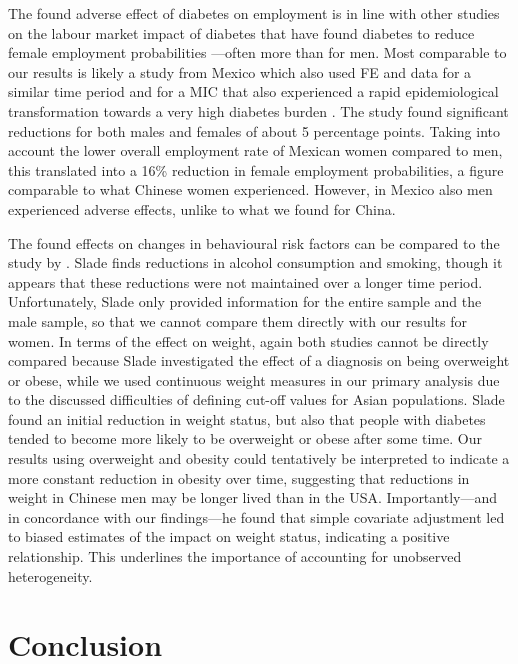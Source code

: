The found adverse effect of diabetes on employment is in line with other studies on the labour market impact of diabetes that have found diabetes to reduce female employment probabilities \parencite{Minor2010,Latif2009,Harris2009,Seuring2016}---often more than for men. Most comparable to our results is likely a study from Mexico which also used \ac{FE} and data for a similar time period and for a \ac{MIC} that also experienced a rapid epidemiological transformation towards a very high diabetes burden  \parencite{Seuring2016}. The study found significant reductions for both males and females of about 5 percentage points. Taking into account the lower overall employment rate of Mexican women compared to men, this translated into a 16\% reduction in female employment probabilities, a figure comparable to what Chinese women experienced. However, in Mexico also men experienced adverse effects, unlike to what we found for China.

The found effects on changes in behavioural risk factors can be compared to the study by \parencite{Slade2012}. Slade finds reductions in alcohol consumption and smoking, though it appears that these reductions were not maintained over a longer time period. Unfortunately, Slade only provided information for the entire sample and the male sample, so that we cannot compare them directly with our results for women. In terms of the effect on weight, again both studies cannot be directly compared because Slade investigated the effect of a diagnosis on being overweight or obese, while we used continuous weight measures in our primary analysis due to the discussed difficulties of defining cut-off values for Asian populations. Slade found an initial reduction in weight status, but also that people with diabetes tended to become more likely to be overweight or obese after some time. Our results using overweight and obesity could tentatively be interpreted to indicate a more constant reduction in obesity over time, suggesting that reductions in weight in Chinese men may be longer lived than in the USA. Importantly---and in concordance with our findings---he found that simple covariate adjustment led to biased estimates of the impact on weight status, indicating a positive relationship. This underlines the importance of accounting for unobserved heterogeneity.



\section{Conclusion}

